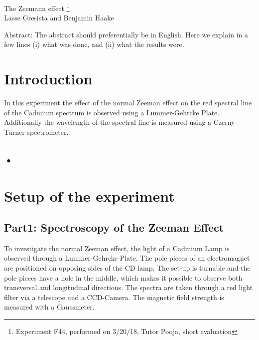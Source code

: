 \documentclass[12pt]{article}
\begin{document}
\thispagestyle{empty}     %
\null
\vspace{40mm}
\begin{center}
{%
\Large  The Zeemann effect
\footnote{\noindent Experiment F44, performed on 3/20/18, Tutor Pooja, short evaluation}}\\[15mm]
Lasse Gresista and Benjamin Haake

\vspace{25mm}

\parbox{0.9\textwidth}{   %
Abstract:    
\small The abstract should preferentially be in English. Here we explain in a
few lines (i) what was done, and (ii) what the results were.
}
\end{center}

\vfill
\vspace{20mm}

\newpage  
\null\thispagestyle{empty}

\newpage
{}

\section{Introduction}
In this experiment the effect of the normal Zeeman effect on the red spectral line of the Cadmium spectrum is observed using a Lummer-Gehrcke Plate. Additionally the wavelength of the spectral line is measured using a Czerny-Turner spectrometer.

\subsection{•}

\section{Setup of the experiment}
\subsection{Part1: Spectroscopy of the Zeeman Effect}
To investigate the normal Zeeman effect, the light of a Cadmium Lamp is observed through a Lummer-Gehrcke Plate. The pole pieces of an electromagnet are positioned on opposing sides of the CD lamp. The set-up is turnable and the pole pieces have a hole in the middle, which makes it possible to observe both transversal and longitudinal directions. The spectra are taken through a red light filter via a telescope and a CCD-Camera. The magnetic field strength is measured with a Gaussmeter.
\end{document}
